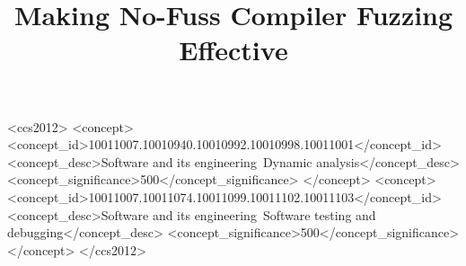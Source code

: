 \documentclass[sigplan,review]{acmart}
\begin{document}
\lstset{style=gostyle}

\title{Making No-Fuss Compiler Fuzzing Effective}




\renewcommand{\shortauthors}{us folks}

\newcommand{\mr}[2]{\multirow{#1}{*}{#2}}
\newcommand{\mc}[3]{\multicolumn{#1}{#2}{#3}}

\newcommand{\clg}[1]{\textcolor{blue}{#1}}
\newcommand{\rvt}[1]{\textcolor{purple}{#1}}
\newcommand{\kj}[1]{\textcolor{olive}{#1}}

\begin{abstract}

\end{abstract}

\begin{CCSXML}
<ccs2012>
<concept>
<concept_id>10011007.10010940.10010992.10010998.10011001</concept_id>
<concept_desc>Software and its engineering~Dynamic analysis</concept_desc>
<concept_significance>500</concept_significance>
</concept>
<concept>
<concept_id>10011007.10011074.10011099.10011102.10011103</concept_id>
<concept_desc>Software and its engineering~Software testing and debugging</concept_desc>
<concept_significance>500</concept_significance>
</concept>
</ccs2012>
\end{CCSXML}




\maketitle










\balance




\balance
\end{document}
